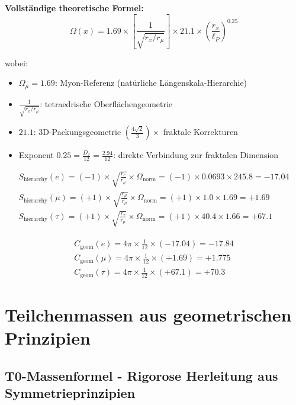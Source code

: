 \documentclass[12pt,a4paper]{article}
\numberwithin{equation}{section}
\newcommand{\Cgeom}{C_{\text{geom}}}
\newcommand{\Df}{D_f}
\newcommand{\lP}{\ell_P}
\newcommand{\Omegafactor}{\Omega}
\begin{document}
	\textbf{Vollständige theoretische Formel:}
	\begin{equation}
		\Omegafactor(x) = 1.69 \times \left[\frac{1}{\sqrt{r_x/r_\mu}}\right] \times 21.1 \times \left(\frac{r_x}{\lP}\right)^{0.25}
		\label{eq:omega_complete}
	\end{equation}
	
	wobei:
	\begin{itemize}
		\item $\Omega_\mu = 1.69$: Myon-Referenz (natürliche Längenskala-Hierarchie)
		\item $\frac{1}{\sqrt{r_x/r_\mu}}$: tetraedrische Oberflächengeometrie
		\item $21.1$: 3D-Packungsgeometrie $\left(\frac{4\sqrt{2}}{3}\right) \times$ fraktale Korrekturen
		\item Exponent $0.25 = \frac{\Df}{12} = \frac{2.94}{12}$: direkte Verbindung zur fraktalen Dimension
	\end{itemize}
	
	\begin{align}
		S_{\text{hierarchy}}(e) = (-1) \times \sqrt{\frac{r_e}{r_\mu}} \times \Omegafactor_{\text{norm}} = (-1) \times 0.0693 \times 245.8 = -17.04\\
		S_{\text{hierarchy}}(\mu) = (+1) \times \sqrt{\frac{r_\mu}{r_\mu}} \times \Omegafactor_{\text{norm}} = (+1) \times 1.0 \times 1.69 = +1.69\\
		S_{\text{hierarchy}}(\tau) = (+1) \times \sqrt{\frac{r_\tau}{r_\mu}} \times \Omegafactor_{\text{norm}} = (+1) \times 40.4 \times 1.66 = +67.1
		\label{eq:signature_factors}
	\end{align}
	
	\begin{align}
		\Cgeom(e) = 4\pi \times \frac{1}{12} \times (-17.04) = -17.84\\
		\Cgeom(\mu) = 4\pi \times \frac{1}{12} \times (+1.69) = +1.775\\
		\Cgeom(\tau) = 4\pi \times \frac{1}{12} \times (+67.1) = +70.3
		\label{eq:cgeom_values}
	\end{align}
	
	\section{Teilchenmassen aus geometrischen Prinzipien}
	
	\subsection{T0-Massenformel - Rigorose Herleitung aus Symmetrieprinzipien}
	
\end{document}
